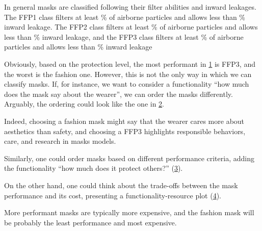 \begin{figure}[h!]
    \centering
    \caption{}
    \label{fig:masks_covid}
\end{figure}

In general masks are classified following their filter abilities and inward leakages.
The FFP1 class filters at least \unit[80]{\%} of airborne particles and allows less than \unit[22]{\%} inward leakage.
The FFP2 class filters at least \unit[96]{\%} of airborne particles and allows less than \unit[8]{\%} inward leakage, and the FFP3 class filters at least \unit[99]{\%} of airborne particles and allows less than \unit[2]{\%} inward leakage

Obviously, based on the protection level, the most performant in \cref{fig:masks_covid} is FFP3, and the worst is the fashion one.
However, this is not the only way in which we can classify masks.
If, for instance, we want to consider a functionality ``how much does the mask say about the wearer'', we can order the masks differently.
Arguably, the ordering could look like the one in \cref{fig:masks_expressive}.

\begin{figure}[h!]
    \centering
    \caption{}
    \label{fig:masks_expressive}
\end{figure}

Indeed, choosing a fashion mask might say that the wearer cares more about aesthetics than safety, and choosing a FFP3 highlights responsible behaviors, care, and research in masks models.

Similarly, one could order masks based on different performance criteria, adding the functionality ``how much does it protect others?'' (\cref{fig:masks_others}).

\begin{figure}[h!]
    \centering
    \caption{}
    \label{fig:masks_others}
\end{figure}

On the other hand, one could think about the trade-offs between the mask performance and its cost, presenting a functionality-resource plot (\cref{fig:masks_price}).

\begin{figure}[h!]
    \centering
    \caption{}
    \label{fig:masks_price}
\end{figure}

More performant masks are typically more expensive, and the fashion mask will be probably the least performance and most expensive.

